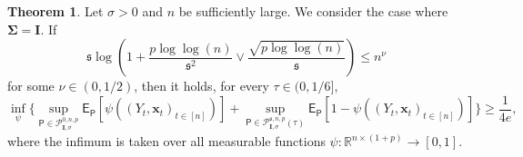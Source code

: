\documentclass[11pt, a4paper]{article}
\newcommand{\mbf}{\mathbf}
\newcommand{\mc}{\mathcal}
\renewcommand{\l}{\left}
\renewcommand{\r}{\right}
\def\wh{\widehat}
\newcommand{\E}[0]{\mathsf{E}}
\newcommand{\p}{\mathsf{P}}
\newcommand{\R}{\mathbb{R}}
\theoremstyle{definition}
\newtheorem{thm}{Theorem}
\theoremstyle{definition}
\theoremstyle{definition}
\theoremstyle{definition}
\theoremstyle{definition}
\theoremstyle{remark}
\theoremstyle{definition}
\theoremstyle{definition}
\theoremstyle{definition}
\begin{document}
\begin{thm}
\label{th:gaussid}
Let $\sigma > 0$ and $n$ be sufficiently large. We consider the case where $\bm\Sigma = \mbf I$.
If 
\begin{equation}\label{e:spn}
\mathfrak{s}\log\l(1 + \frac{p\log\log(n)}{\mathfrak{s}^2} \vee \frac{\sqrt{p\log\log(n)}}{\mathfrak{s}} \r) \le n^{\nu}
\end{equation} 
for some $\nu \in (0, 1/2)$, then it holds, for every $\tau \in (0,  1/6]$,
$$
\inf_{\psi}\biggl\{  \sup_{\p \in \mc P_{\mbf I, \sigma}^{0, n, p}} \E_{\p}\l[\psi\l((Y_t, \mbf x_t)_{t\in[n]}\r)\r]  +  \sup_{\p \in \mc P_{\mbf I, \sigma}^{\mathfrak{s}, n, p}(\tau)} \E_{\p}\l[1-\psi\l((Y_t, \mbf x_t)_{t\in[n]}\r)\r]\biggr\} \ge \frac{1}{4e},
$$   
where the infimum is taken over all measurable functions $\psi:\R^{n \times (1+p)}\to[0,1]$. 
\end{thm}
\end{document}
